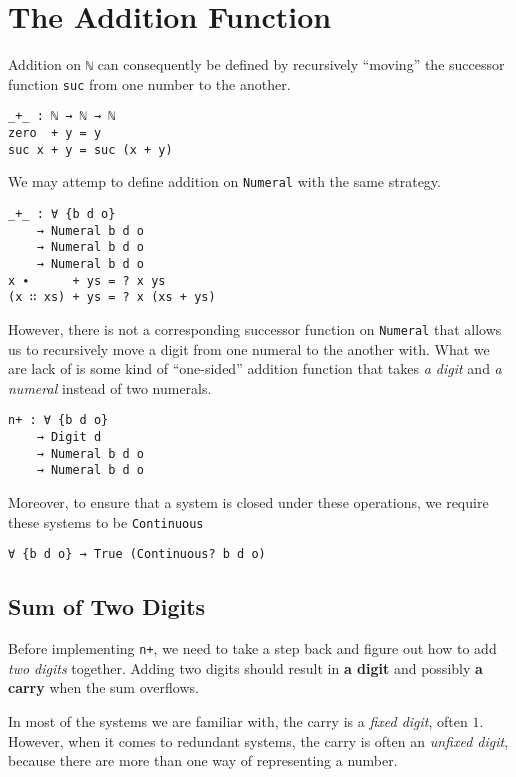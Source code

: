 \documentclass[\main/thesis.tex]{subfiles}
\begin{document}
\section{The Addition Function}\label{addition}

Addition on \lstinline|ℕ| can consequently be defined by recursively ``moving''
the successor function \lstinline|suc| from one number to the another.

\begin{lstlisting}
_+_ : ℕ → ℕ → ℕ
zero  + y = y
suc x + y = suc (x + y)
\end{lstlisting}

We may attemp to define addition on \lstinline|Numeral| with the same strategy.

\begin{lstlisting}
_+_ : ∀ {b d o}
    → Numeral b d o
    → Numeral b d o
    → Numeral b d o
x ∙      + ys = ? x ys
(x ∷ xs) + ys = ? x (xs + ys)
\end{lstlisting}

However, there is not a corresponding successor function on \lstinline|Numeral|
that allows us to recursively move a digit from one numeral to the another with.
What we are lack of is some kind of ``one-sided'' addition function that takes
\textit{a digit} and \textit{a numeral} instead of two numerals.

\begin{lstlisting}
n+ : ∀ {b d o}
    → Digit d
    → Numeral b d o
    → Numeral b d o
\end{lstlisting}

Moreover, to ensure that a system is closed under these operations,
we require these systems to be \lstinline|Continuous|

\begin{lstlisting}
∀ {b d o} → True (Continuous? b d o)
\end{lstlisting}

\subsection{Sum of Two Digits}

Before implementing \lstinline|n+|, we need to take a step back and figure out
how to add \textit{two digits} together.
Adding two digits should result in \textbf{a digit} and
possibly \textbf{a carry} when the sum overflows.

In most of the systems we are familiar with, the carry is a \textit{fixed digit},
often $ 1 $.
However, when it comes to redundant systems, the carry is often an
\textit{unfixed digit}, because there are more than one way of representing
a number.
\end{document}
